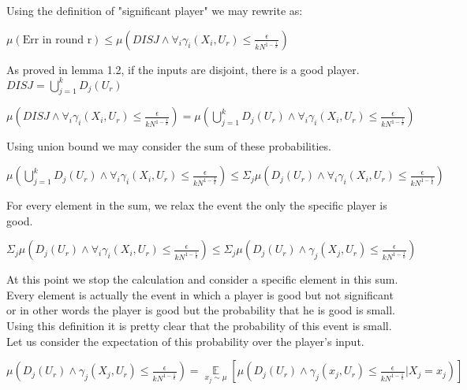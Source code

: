 \documentclass{article}
\theoremstyle{plain}
\begin{document}
Using the definition of "significant player" we may rewrite as: \newline

$\mu(\text{Err in round r}) \leq \mu(DISJ \land \forall_i \gamma_i(X_i, U_r) \leq \frac{\epsilon}{kN^{1-\frac{1}{k}}})$ \newline

As proved in lemma 1.2, if the inputs are disjoint, there is a good player. $DISJ = \bigcup_{j = 1}^k D_j(U_r)$ \newline

$ \mu(DISJ \land \forall_i \gamma_i(X_i, U_r) \leq \frac{\epsilon}{kN^{1-\frac{1}{k}}}) = \mu(\bigcup_{j = 1}^k D_j(U_r) \land \forall_i \gamma_i(X_i, U_r) \leq \frac{\epsilon}{kN^{1-\frac{1}{k}}})$ \newline

Using union bound we may consider the sum of these probabilities. \newline

$ \mu(\bigcup_{j = 1}^k D_j(U_r) \land \forall_i \gamma_i(X_i, U_r) \leq \frac{\epsilon}{kN^{1-\frac{1}{k}}}) \leq \Sigma_j \mu(D_j(U_r) \land \forall_i \gamma_i(X_i, U_r) \leq \frac{\epsilon}{kN^{1-\frac{1}{k}}})$ \newline

For every element in the sum, we relax the event the only the specific player is good. \newline

$\Sigma_j \mu(D_j(U_r) \land \forall_i \gamma_i(X_i, U_r) \leq \frac{\epsilon}{kN^{1-\frac{1}{k}}}) \leq \Sigma_j \mu(D_j(U_r) \land \gamma_j(X_j, U_r) \leq \frac{\epsilon}{kN^{1-\frac{1}{k}}})$ \newline

At this point we stop the calculation and consider a specific element in this sum. Every element is actually the event in which a player is good but not significant or in other words the player is good but the probability that he is good is small. Using this definition it is pretty clear that the probability of this event is small. \newline
Let us consider the expectation of this probability over the player's input. \newline

$\mu(D_j(U_r) \land \gamma_j(X_j, U_r) \leq \frac{\epsilon}{kN^{1-\frac{1}{k}}}) = \underset{x_j \sim \mu}{\mathop{\mathbb{E}}}[\mu(D_j(U_r) \land \gamma_j(x_j, U_r) \leq \frac{\epsilon}{kN^{1-\frac{1}{k}}} | X_j = x_j)]$ \newline
\end{document}
